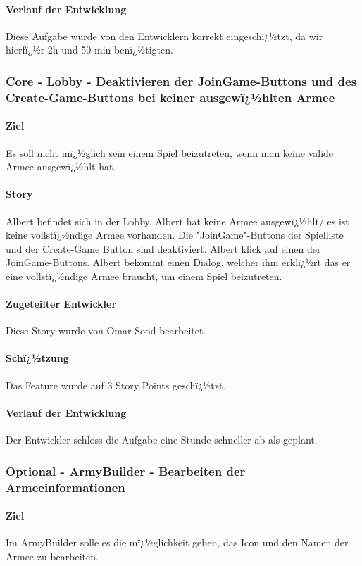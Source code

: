 \documentclass[12pt, titlepage]{scrartcl}
\begin{document}
			\paragraph{Verlauf der Entwicklung} 
			Diese Aufgabe wurde von den Entwicklern korrekt eingeschï¿½tzt, da wir hierfï¿½r 2h und 50 min benï¿½tigten.
			
			\subsubsection{Core - Lobby - Deaktivieren der JoinGame-Buttons und des Create-Game-Buttons bei keiner ausgewï¿½hlten Armee}
			\paragraph{Ziel} Es soll nicht mï¿½glich sein einem Spiel beizutreten, wenn man keine valide Armee ausgewï¿½hlt hat.
			\paragraph{Story} Albert befindet sich in der Lobby. Albert hat keine Armee ausgewï¿½hlt/ es ist keine vollstï¿½ndige Armee vorhanden. Die "JoinGame"-Buttons der Spielliste und der Create-Game Button sind deaktiviert. Albert klick auf einen der JoinGame-Buttons. Albert bekommt einen Dialog, welcher ihm erklï¿½rt das er eine vollstï¿½ndige Armee braucht, um einem Spiel beizutreten.
			\paragraph{Zugeteilter Entwickler} Diese Story wurde von Omar Sood bearbeitet.
			\paragraph{Schï¿½tzung}
			Das Feature wurde auf 3 Story Points geschï¿½tzt.
			\paragraph{Verlauf der Entwicklung} 
			Der Entwickler schloss die Aufgabe eine Stunde schneller ab als geplant.
			
			\subsubsection{Optional - ArmyBuilder - Bearbeiten der Armeeinformationen}
			\paragraph{Ziel} Im ArmyBuilder solle es die mï¿½glichkeit geben, das Icon und den Namen der Armee zu bearbeiten.
\end{document}
